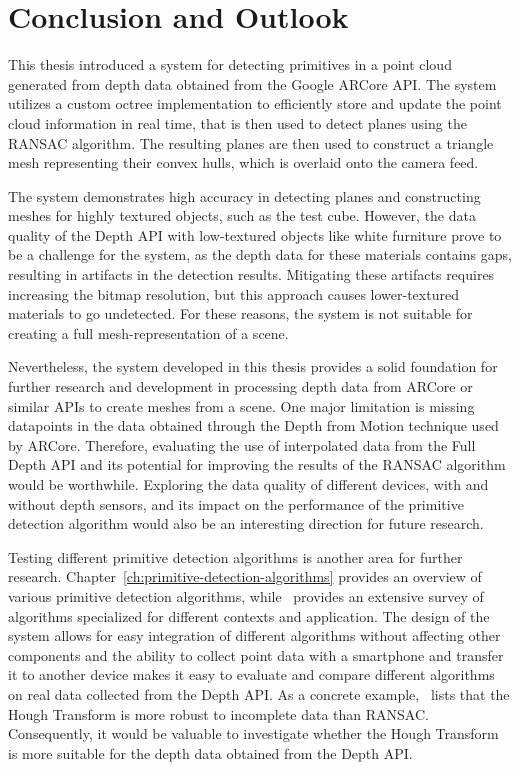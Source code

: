 \chapter{Conclusion and Outlook}

This thesis introduced a system for detecting primitives in a point cloud generated from depth data obtained from the Google ARCore API.
The system utilizes a custom octree implementation to efficiently store and update the point cloud information in real time,
that is then used to detect planes using the RANSAC algorithm.
The resulting planes are then used to construct a triangle mesh representing their convex hulls,
which is overlaid onto the camera feed.

The system demonstrates high accuracy in detecting planes and constructing meshes for highly textured objects,
such as the test cube.
However, the data quality of the Depth API with low-textured objects like white furniture prove to be a challenge for the system,
as the depth data for these materials contains gaps, resulting in artifacts in the detection results.
Mitigating these artifacts requires increasing the bitmap resolution, but this approach causes lower-textured materials to go undetected.
For these reasons, the system is not suitable for creating a full mesh-representation of a scene.

Nevertheless, the system developed in this thesis provides a solid foundation for further research and development in processing depth data from ARCore or similar APIs to create meshes from a scene.
One major limitation is missing datapoints in the data obtained through the Depth from Motion technique used by ARCore.
Therefore, evaluating the use of interpolated data from the Full Depth API and its potential for improving the results of the RANSAC algorithm would be worthwhile.
Exploring the data quality of different devices, with and without depth sensors, and its impact on the performance of
the primitive detection algorithm would also be an interesting direction for future research.

Testing different primitive detection algorithms is another area for further research.
Chapter~\ref{ch:primitive-detection-algorithms} provides an overview of various primitive detection algorithms,
while~\cite{kaiser_survey_2019} provides an extensive survey of algorithms specialized for different contexts and application.
The design of the system allows for easy integration of different algorithms without affecting other components and
the ability to collect point data with a smartphone and transfer it to another device makes it easy
to evaluate and compare different algorithms on real data collected from the Depth API\@.
As a concrete example,~\cite{kaiser_survey_2019} lists that the Hough Transform is more robust to incomplete data than RANSAC\@.
Consequently, it would be valuable to investigate whether the Hough Transform is more suitable for the depth data
obtained from the Depth API\@.

